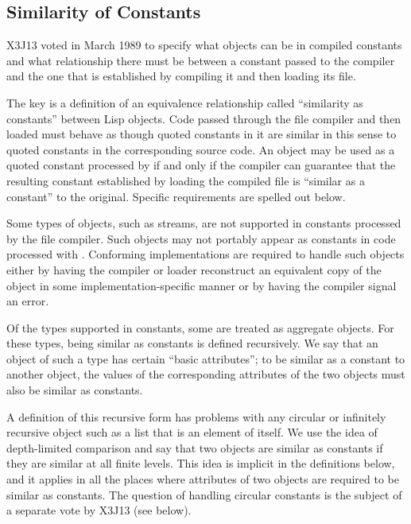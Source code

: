 \begin{newer}
\subsection{Similarity of Constants}
\label{SIMILAR-AS-A-CONSTANT-SECTION}

X3J13 voted in March 1989 
to specify what objects can be in compiled constants and
what relationship there must be between a constant
passed to the compiler and the one that is established by compiling it
and then loading its file.

The key is a definition of an equivalence relationship called
``similarity as constants''
between Lisp
objects.  Code passed through the file
compiler and then loaded must behave as though quoted constants in it
are similar in this sense to quoted constants in the corresponding source code.
An object may be used as a quoted constant processed by 
if and only if the compiler can guarantee that the resulting constant established
by loading the compiled file is ``similar as a constant'' to the
original.  Specific requirements are spelled out below.

Some types of objects, such as streams, are not supported in constants
processed by the file compiler.  Such objects may not portably appear
as constants in code processed with .  Conforming
implementations are required to handle such objects either by having
the compiler or loader reconstruct an equivalent copy of the
object in some implementation-specific manner or by having the
compiler signal an error.

Of the types supported in constants, some are treated as aggregate
objects.  For these types, being similar as constants is defined
recursively.  We say that an object of such a type has certain ``basic
attributes''; to be similar as a constant to another object, the
values of the corresponding attributes of the two objects must also be
similar as constants.

A definition of this recursive form has problems with any circular or infinitely
recursive object such as a list that is an element of itself.  We use
the idea of depth-limited comparison and say that two objects are
similar as constants if they are similar at all finite levels.  This
idea is implicit in the definitions below, and it applies in all the
places where attributes of two objects are required to be similar as
constants.  The question of handling circular constants is the subject
of a separate vote by X3J13 (see below).


\end{newer}
